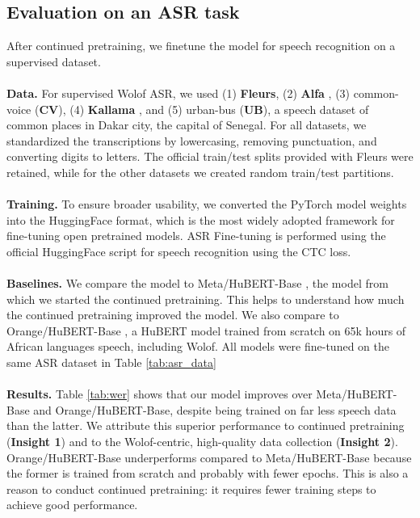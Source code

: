 \documentclass{article}
\newcommand{\myparagraph}[1]{\noindent\textbf{#1}}
\begin{document}
\subsection{Evaluation on an ASR task}
\label{sec:asr_exps}
After continued pretraining, we finetune the model for speech recognition on a supervised dataset.
\\
\\
\myparagraph{Data.} For supervised Wolof ASR, we used (1) \textbf{Fleurs}, (2) \textbf{Alfa} \cite{gauthierSSL}, (3) common-voice (\textbf{CV}), (4) \textbf{Kallama} \cite{kallama}, and (5) urban-bus \cite{urbanbus} (\textbf{UB}), a speech dataset of common places in Dakar city, the capital of Senegal. For all datasets, we standardized the transcriptions by lowercasing, removing punctuation, and converting digits to letters. The official train/test splits provided with Fleurs were retained, while for the other datasets we created random train/test partitions.
\\
\\
\myparagraph{Training.} To ensure broader usability, we converted the PyTorch model weights into the HuggingFace format, which is the most widely adopted framework for fine-tuning open pretrained models. ASR Fine-tuning is performed using the official HuggingFace script for speech recognition using the CTC loss.
\\
\\
\myparagraph{Baselines.} We compare the model to Meta/HuBERT-Base \cite{hubert}, the model from which we started the continued pretraining. This helps to understand how much the continued pretraining improved the model. We also compare to Orange/HuBERT-Base \cite{afribert}, a HuBERT model trained from scratch on 65k hours of African languages speech, including Wolof. All models were fine-tuned on the same ASR dataset in Table \ref{tab:asr_data}
\\
\\
\myparagraph{Results.} Table \ref{tab:wer} shows that our model improves over Meta/HuBERT-Base and Orange/HuBERT-Base, despite being trained on far less speech data than the latter. We attribute this superior performance to continued pretraining (\textbf{Insight 1}) and to the Wolof-centric, high-quality data collection (\textbf{Insight 2}). Orange/HuBERT-Base underperforms compared to Meta/HuBERT-Base because the former is trained from scratch and probably with fewer epochs. This is also a reason to conduct continued pretraining: it requires fewer training steps to achieve good performance.
\end{document}
